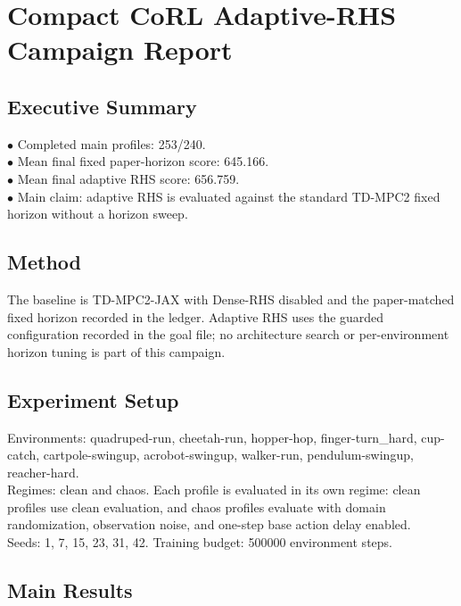 \documentclass{article}
\begin{document}
\section*{Compact CoRL Adaptive-RHS Campaign Report}

\subsection*{Executive Summary}

\noindent $\bullet$ Completed main profiles: 253/240.\\
\noindent $\bullet$ Mean final fixed paper-horizon score: 645.166.\\
\noindent $\bullet$ Mean final adaptive RHS score: 656.759.\\
\noindent $\bullet$ Main claim: adaptive RHS is evaluated against the standard TD-MPC2 fixed horizon without a horizon sweep.\\

\subsection*{Method}

The baseline is TD-MPC2-JAX with Dense-RHS disabled and the paper-matched fixed horizon recorded in the ledger. Adaptive RHS uses the guarded configuration recorded in the goal file; no architecture search or per-environment horizon tuning is part of this campaign.\\

\subsection*{Experiment Setup}

Environments: quadruped-run, cheetah-run, hopper-hop, finger-turn\_hard, cup-catch, cartpole-swingup, acrobot-swingup, walker-run, pendulum-swingup, reacher-hard.\\

Regimes: clean and chaos. Each profile is evaluated in its own regime: clean profiles use clean evaluation, and chaos profiles evaluate with domain randomization, observation noise, and one-step base action delay enabled.\\

Seeds: 1, 7, 15, 23, 31, 42. Training budget: 500000 environment steps.\\

\subsection*{Main Results}
\end{document}
